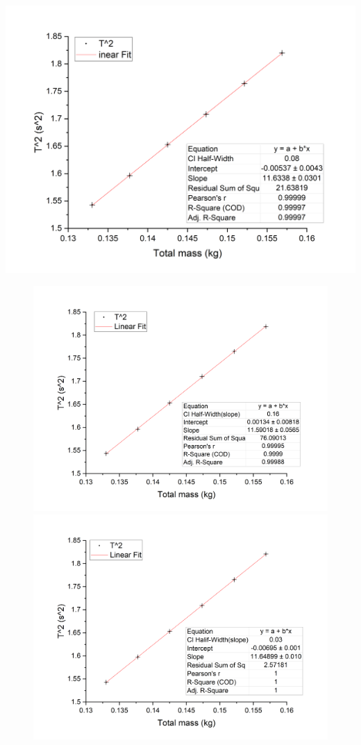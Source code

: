 \documentclass[12pt,a4paper]{article}
\begin{document}
    \begin{center}
        \includegraphics[scale=0.32]{horizontal.png}
        \begin{figure}[H]
                \includegraphics[scale=0.32]{incline1.png}
        \includegraphics[scale=0.32]{incline2.png}

\end{figure}
\end{center}
\end{document}
